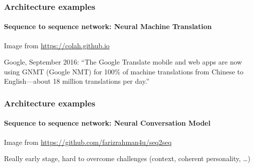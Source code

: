\documentclass[9pt]{beamer}
\begin{document}
\begin{frame}
  \frametitle{Architecture examples}

  \framesubtitle{Sequence to sequence network: Neural Machine Translation}

  \begin{center}
  \end{center}

  {\small Image from \url{https://colah.github.io}}
  
  \bigskip

  Google, September 2016: ``The Google Translate mobile and web apps
  are now using GNMT (Google NMT) for 100\% of machine translations
  from Chinese to English—about 18 million translations per day.''

\end{frame}

\begin{frame}
  \frametitle{Architecture examples}

  \framesubtitle{Sequence to sequence network: Neural Conversation Model}

  \begin{center}
  \end{center}

  {\small Image from \url{https://github.com/farizrahman4u/seq2seq}}

  \bigskip

  Really early stage, hard to overcome challenges (context, coherent
  personality, \dots)
\end{frame}
\end{document}
